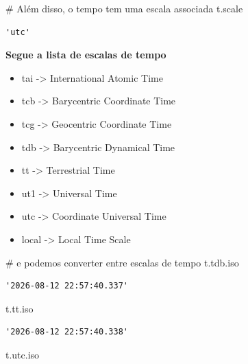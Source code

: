 \documentclass[
  letterpaper,
  DIV=11,
  numbers=noendperiod]{scrreprt}
\newenvironment{Shaded}{\begin{snugshade}}{\end{snugshade}}
\newcommand{\CommentTok}[1]{\textcolor[rgb]{0.37,0.37,0.37}{#1}}
\newcommand{\NormalTok}[1]{\textcolor[rgb]{0.00,0.23,0.31}{#1}}
\providecommand{\tightlist}{%
  \setlength{\itemsep}{0pt}\setlength{\parskip}{0pt}}
\begin{document}
\begin{Shaded}
\begin{Highlighting}[]
\CommentTok{\# Além disso, o tempo tem uma escala associada}
\NormalTok{t.scale}
\end{Highlighting}
\end{Shaded}

\begin{verbatim}
'utc'
\end{verbatim}

\textbf{Segue a lista de escalas de tempo}

\begin{itemize}
\tightlist
\item
  tai -\textgreater{} International Atomic Time
\item
  tcb -\textgreater{} Barycentric Coordinate Time
\item
  tcg -\textgreater{} Geocentric Coordinate Time
\item
  tdb -\textgreater{} Barycentric Dynamical Time
\item
  tt -\textgreater{} Terrestrial Time
\item
  ut1 -\textgreater{} Universal Time
\item
  utc -\textgreater{} Coordinate Universal Time
\item
  local -\textgreater{} Local Time Scale
\end{itemize}

\begin{Shaded}
\begin{Highlighting}[]
\CommentTok{\# e podemos converter entre escalas de tempo}
\NormalTok{t.tdb.iso}
\end{Highlighting}
\end{Shaded}

\begin{verbatim}
'2026-08-12 22:57:40.337'
\end{verbatim}

\begin{Shaded}
\begin{Highlighting}[]
\NormalTok{t.tt.iso}
\end{Highlighting}
\end{Shaded}

\begin{verbatim}
'2026-08-12 22:57:40.338'
\end{verbatim}

\begin{Shaded}
\begin{Highlighting}[]
\NormalTok{t.utc.iso}
\end{Highlighting}
\end{Shaded}
\end{document}

